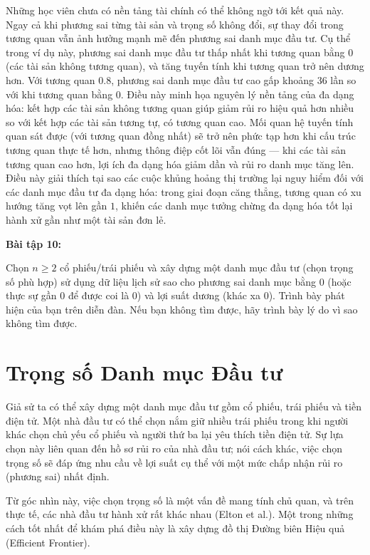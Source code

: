 Những học viên chưa có nền tảng tài chính có thể không ngờ tới kết quả này. Ngay cả khi phương sai từng tài sản và trọng số không đổi, sự thay đổi trong tương quan vẫn ảnh hưởng mạnh mẽ đến phương sai danh mục đầu tư. Cụ thể trong ví dụ này, phương sai danh mục đầu tư thấp nhất khi tương quan bằng 0 (các tài sản không tương quan), và tăng tuyến tính khi tương quan trở nên dương hơn. Với tương quan $0.8$, phương sai danh mục đầu tư cao gấp khoảng $36$ lần so với khi tương quan bằng 0. Điều này minh họa nguyên lý nền tảng của đa dạng hóa: kết hợp các tài sản không tương quan giúp giảm rủi ro hiệu quả hơn nhiều so với kết hợp các tài sản tương tự, có tương quan cao. Mối quan hệ tuyến tính quan sát được (với tương quan đồng nhất) sẽ trở nên phức tạp hơn khi cấu trúc tương quan thực tế hơn, nhưng thông điệp cốt lõi vẫn đúng — khi các tài sản tương quan cao hơn, lợi ích đa dạng hóa giảm dần và rủi ro danh mục tăng lên. Điều này giải thích tại sao các cuộc khủng hoảng thị trường lại nguy hiểm đối với các danh mục đầu tư đa dạng hóa: trong giai đoạn căng thẳng, tương quan có xu hướng tăng vọt lên gần $1$, khiến các danh mục tưởng chừng đa dạng hóa tốt lại hành xử gần như một tài sản đơn lẻ.

\textbf{Bài tập 10:}

Chọn $n \geq 2$ cổ phiếu/trái phiếu và xây dựng một danh mục đầu tư (chọn trọng số phù hợp) sử dụng dữ liệu lịch sử sao cho phương sai danh mục bằng $0$ (hoặc thực sự gần $0$ để được coi là $0$) và lợi suất dương (khác xa $0$). Trình bày phát hiện của bạn trên diễn đàn. Nếu bạn không tìm được, hãy trình bày lý do vì sao không tìm được.

\section{Trọng số Danh mục Đầu tư}

Giả sử ta có thể xây dựng một danh mục đầu tư gồm cổ phiếu, trái phiếu và tiền điện tử. Một nhà đầu tư có thể chọn nắm giữ nhiều trái phiếu trong khi người khác chọn chủ yếu cổ phiếu và người thứ ba lại yêu thích tiền điện tử. Sự lựa chọn này liên quan đến hồ sơ rủi ro của nhà đầu tư; nói cách khác, việc chọn trọng số sẽ đáp ứng nhu cầu về lợi suất cụ thể với một mức chấp nhận rủi ro (phương sai) nhất định.

Từ góc nhìn này, việc chọn trọng số là một vấn đề mang tính chủ quan, và trên thực tế, các nhà đầu tư hành xử rất khác nhau (Elton et al.). Một trong những cách tốt nhất để khám phá điều này là xây dựng đồ thị Đường biên Hiệu quả (Efficient Frontier).

